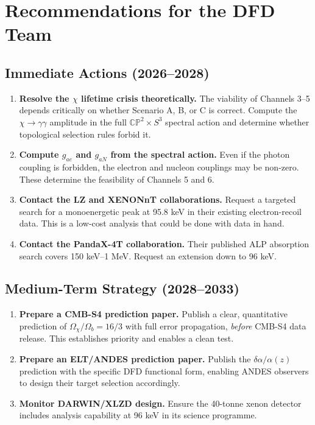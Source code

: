 \documentclass[12pt,a4paper]{article}
\begin{document}
\section{Recommendations for the DFD Team}

\subsection{Immediate Actions (2026--2028)}

\begin{enumerate}
\item \textbf{Resolve the $\chi$ lifetime crisis theoretically.}
The viability of Channels 3--5 depends critically on whether
Scenario A, B, or C is correct. Compute the $\chi \to \gamma\gamma$
amplitude in the full $\mathbb{CP}^2 \times S^3$ spectral action
and determine whether topological selection rules forbid it.

\item \textbf{Compute $g_{ae}$ and $g_{aN}$ from the spectral action.}
Even if the photon coupling is forbidden, the electron and nucleon
couplings may be non-zero. These determine the feasibility of
Channels 5 and 6.

\item \textbf{Contact the LZ and XENONnT collaborations.}
Request a targeted search for a monoenergetic peak at 95.8 keV in
their existing electron-recoil data. This is a low-cost analysis
that could be done with data in hand.

\item \textbf{Contact the PandaX-4T collaboration.}
Their published ALP absorption search covers 150 keV--1 MeV.
Request an extension down to 96 keV.
\end{enumerate}

\subsection{Medium-Term Strategy (2028--2033)}

\begin{enumerate}
\item \textbf{Prepare a CMB-S4 prediction paper.}
Publish a clear, quantitative prediction of
$\Omega_\chi/\Omega_b = 16/3$ with full error propagation,
\emph{before} CMB-S4 data release. This establishes priority
and enables a clean test.

\item \textbf{Prepare an ELT/ANDES prediction paper.}
Publish the $\delta\alpha/\alpha(z)$ prediction with the specific
DFD functional form, enabling ANDES observers to design their
target selection accordingly.

\item \textbf{Monitor DARWIN/XLZD design.}
Ensure the 40-tonne xenon detector includes analysis capability
at 96 keV in its science programme.
\end{enumerate}
\end{document}
